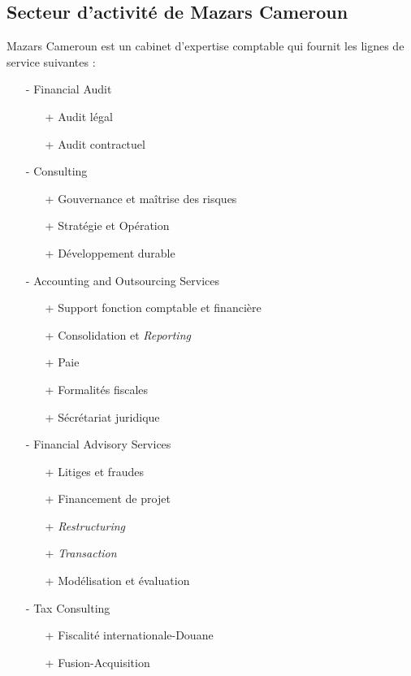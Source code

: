 \subsection{Secteur d'activité de Mazars Cameroun}
Mazars Cameroun est un cabinet d’expertise comptable qui fournit les lignes de service suivantes :
\begin{itemize}
    \item [-] Financial Audit
    \begin{itemize}
        \item[+] Audit légal
        \item[+] Audit contractuel
    \end{itemize}
    \item[-] Consulting
    \begin{itemize}
        \item[+] Gouvernance et maîtrise des risques
        \item[+] Stratégie et Opération
        \item[+] Développement durable
    \end{itemize}
    \item[-] Accounting and Outsourcing Services
    \begin{itemize}
        \item[+] Support fonction comptable et financière
        \item[+] Consolidation et \textit{Reporting}
        \item[+] Paie
        \item[+] Formalités fiscales
        \item[+] Sécrétariat juridique
    \end{itemize}
    \item[-] Financial Advisory Services
    \begin{itemize}
        \item[+] Litiges et fraudes
        \item[+] Financement de projet
        \item[+] \textit{Restructuring}
        \item[+] \textit{Transaction}
        \item[+] Modélisation et évaluation
    \end{itemize}
    \item[-] Tax Consulting
    \begin{itemize}
        \item[+] Fiscalité internationale-Douane
        \item[+] Fusion-Acquisition

\end{itemize}
\end{itemize}
